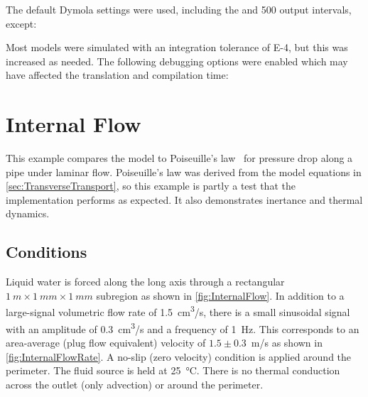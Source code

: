 The default Dymola settings were used, including the  and 500 output intervals, except:
\begin{enumerate*}
  \item {}
  \item {}
  \item {}
  \item {}
\end{enumerate*}
Most models were simulated with an integration tolerance of \num{E-4}, but this was increased as needed.  The following debugging options were enabled which may have affected the translation and compilation time:
\begin{enumerate*}
  \item {}
  \item {}
  \item {}
  \item {}
  \item {}
  \item {}
  \item {}
\end{enumerate*}



\section{Internal Flow}
\label{sec:InternalFlow}

This example compares the model to Poiseuille's law~\cite{Cengel2006} for pressure drop along a pipe under laminar flow.  Poiseuille's law was derived from the model equations in \autoref{sec:TransverseTransport}, so this example is partly a test that the implementation performs as expected.  It also demonstrates inertance and thermal dynamics.

\subsection{Conditions}

Liquid water is forced along the long axis through a rectangular $\SI{1}{m}\times\SI{1}{mm}\times\SI{1}{mm}$ subregion as shown in \autoref{fig:InternalFlow}.  In addition to a large-signal volumetric flow rate of \SI{1.5}{cm^3/s}, there is a small sinusoidal signal with an amplitude of \SI{0.3}{cm^3/s} and a frequency of \SI{1}{Hz}.  This corresponds to an area-average (plug flow equivalent) velocity of $1.5\pm$\SI{0.3}{m/s} as shown in \autoref{fig:InternalFlowRate}. %
A no-slip (zero velocity) condition is applied around the perimeter.  The fluid source is held at \SI{25}{\celsius}.  There is no thermal conduction across the outlet (only advection) or around the perimeter.  

